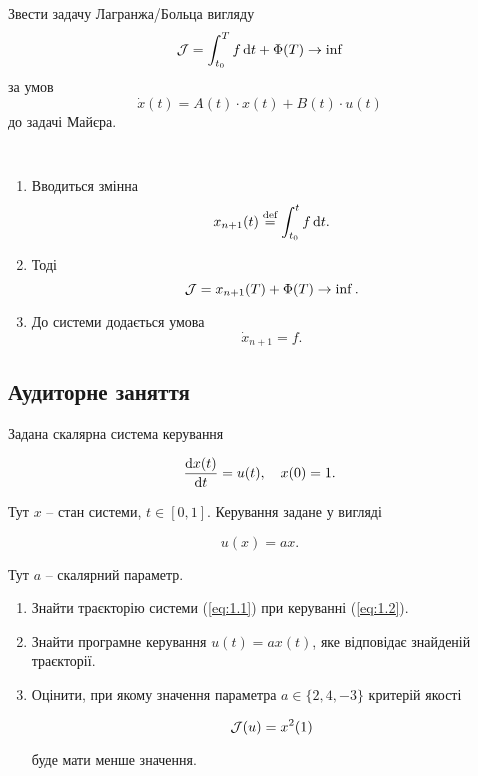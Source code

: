 \begin{problem*}
	Звести задачу Лагранжа/Больца вигляду \[\mathcal{J} = \int_{t_0}^T f \mathop{}\!\mathrm{d} t + \Phi(T) \to \inf \] за умов \[ \dot{x} (t) = A (t) \cdot x(t) + B(t) \cdot u(t) \] до задачі Майєра.
\end{problem*}

\begin{algorithm} \tt
	\begin{enumerate}
		\item Вводиться змінна \[x_{n+1} (t) \overset{\text{def}}{=} \int_{t_0}^t f \mathop{}\!\mathrm{d} t.\]
		\item Тоді \[ \mathcal{J} = x_{n+1} (T) + \Phi(T) \to \inf. \]
		\item До системи додається умова \[ \dot x_{n+1} = f. \]
	\end{enumerate}
\end{algorithm}

\newpage

\subsection{Аудиторне заняття}

\begin{problem}
	Задана скалярна система керування 
	
	\begin{equation}
		\label{eq:1.1}
		\frac{\mathop{}\!\mathrm{d} x(t)}{\mathop{}\!\mathrm{d} t} = u(t), \quad x(0) = 1.
	\end{equation}

	Тут $x$ -- стан системи, $t \in [0, 1]$. Керування задане у вигляді

	\begin{equation}
		\label{eq:1.2}
		u(x) = a x.
	\end{equation}

	Тут $a$ -- скалярний параметр.

	\begin{enumerate}
		\item Знайти траєкторію системи (\ref{eq:1.1}) при керуванні (\ref{eq:1.2}).

		\item Знайти програмне керування $u(t) = a x (t)$, яке відповідає знайденій траєкторії. 

		\item Оцінити, при якому значення параметра $a \in \{2, 4, -3\}$ критерій якості 

		\[ \mathcal{J}(u) = x^2 (1) \]

		буде мати менше значення.
	\end{enumerate}
\end{problem}

